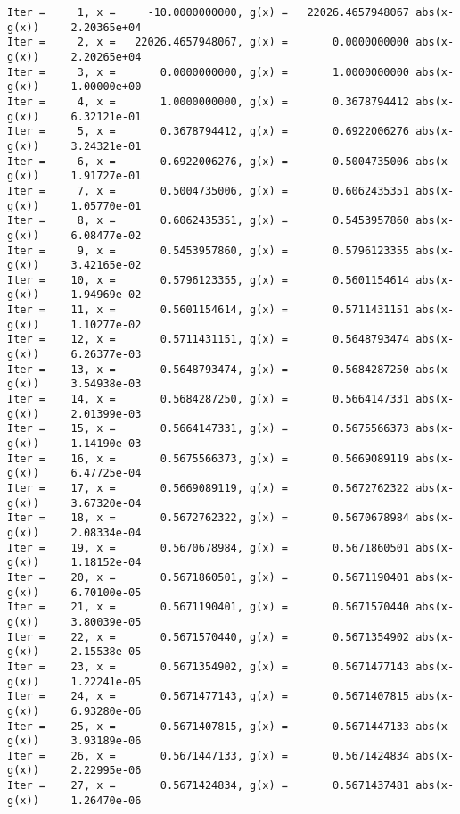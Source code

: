 \documentclass[11pt]{article}
\begin{document}
    \begin{Verbatim}[commandchars=\\\{\}]
Iter =     1, x =     -10.0000000000, g(x) =   22026.4657948067 abs(x-g(x))     2.20365e+04
Iter =     2, x =   22026.4657948067, g(x) =       0.0000000000 abs(x-g(x))     2.20265e+04
Iter =     3, x =       0.0000000000, g(x) =       1.0000000000 abs(x-g(x))     1.00000e+00
Iter =     4, x =       1.0000000000, g(x) =       0.3678794412 abs(x-g(x))     6.32121e-01
Iter =     5, x =       0.3678794412, g(x) =       0.6922006276 abs(x-g(x))     3.24321e-01
Iter =     6, x =       0.6922006276, g(x) =       0.5004735006 abs(x-g(x))     1.91727e-01
Iter =     7, x =       0.5004735006, g(x) =       0.6062435351 abs(x-g(x))     1.05770e-01
Iter =     8, x =       0.6062435351, g(x) =       0.5453957860 abs(x-g(x))     6.08477e-02
Iter =     9, x =       0.5453957860, g(x) =       0.5796123355 abs(x-g(x))     3.42165e-02
Iter =    10, x =       0.5796123355, g(x) =       0.5601154614 abs(x-g(x))     1.94969e-02
Iter =    11, x =       0.5601154614, g(x) =       0.5711431151 abs(x-g(x))     1.10277e-02
Iter =    12, x =       0.5711431151, g(x) =       0.5648793474 abs(x-g(x))     6.26377e-03
Iter =    13, x =       0.5648793474, g(x) =       0.5684287250 abs(x-g(x))     3.54938e-03
Iter =    14, x =       0.5684287250, g(x) =       0.5664147331 abs(x-g(x))     2.01399e-03
Iter =    15, x =       0.5664147331, g(x) =       0.5675566373 abs(x-g(x))     1.14190e-03
Iter =    16, x =       0.5675566373, g(x) =       0.5669089119 abs(x-g(x))     6.47725e-04
Iter =    17, x =       0.5669089119, g(x) =       0.5672762322 abs(x-g(x))     3.67320e-04
Iter =    18, x =       0.5672762322, g(x) =       0.5670678984 abs(x-g(x))     2.08334e-04
Iter =    19, x =       0.5670678984, g(x) =       0.5671860501 abs(x-g(x))     1.18152e-04
Iter =    20, x =       0.5671860501, g(x) =       0.5671190401 abs(x-g(x))     6.70100e-05
Iter =    21, x =       0.5671190401, g(x) =       0.5671570440 abs(x-g(x))     3.80039e-05
Iter =    22, x =       0.5671570440, g(x) =       0.5671354902 abs(x-g(x))     2.15538e-05
Iter =    23, x =       0.5671354902, g(x) =       0.5671477143 abs(x-g(x))     1.22241e-05
Iter =    24, x =       0.5671477143, g(x) =       0.5671407815 abs(x-g(x))     6.93280e-06
Iter =    25, x =       0.5671407815, g(x) =       0.5671447133 abs(x-g(x))     3.93189e-06
Iter =    26, x =       0.5671447133, g(x) =       0.5671424834 abs(x-g(x))     2.22995e-06
Iter =    27, x =       0.5671424834, g(x) =       0.5671437481 abs(x-g(x))     1.26470e-06

\end{Verbatim}
\end{document}
